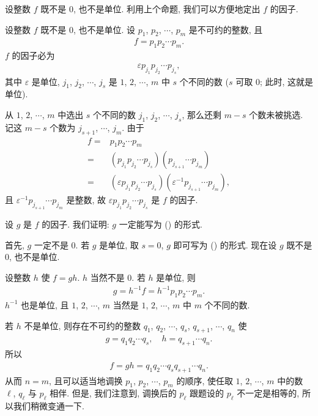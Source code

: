 设整数 $f$ 既不是 $0$, 也不是单位. 利用上个命题, 我们可以方便地定出 $f$ 的因子.

\begin{proposition}
    设整数 $f$ 既不是 $0$, 也不是单位. 设 $p_1$, $p_2$, $\cdots$, $p_m$ 是不可约的整数, 且
    \begin{align*}
        f = p_1 p_2 \cdots p_m.
    \end{align*}
    $f$ 的因子必为
    \begin{align*}
        \varepsilon p_{j_1} p_{j_2} \cdots p_{j_s} \tag*{(\myStar)},
    \end{align*}
    其中 $\varepsilon$ 是单位, $j_1$, $j_2$, $\cdots$, $j_s$ 是 $1$, $2$, $\cdots$, $m$ 中 $s$ 个不同的数 ($s$ 可取 $0$; 此时, 这就是单位).
\end{proposition}

\begin{pf}
    从 $1$, $2$, $\cdots$, $m$ 中选出 $s$ 个不同的数 $j_1$, $j_2$, $\cdots$, $j_s$, 那么还剩 $m-s$ 个数未被挑选. 记这 $m-s$ 个数为 $j_{s+1}$, $\cdots$, $j_m$. 由于
    \begin{align*}
        f
        = {} & p_1 p_2 \cdots p_m                                                                          \\
        = {} & (p_{j_1} p_{j_2} \cdots p_{j_s}) (p_{j_{s+1}} \cdots p_{j_m})                               \\
        = {} & (\varepsilon p_{j_1} p_{j_2} \cdots p_{j_s}) (\varepsilon^{-1} p_{j_{s+1}} \cdots p_{j_m}),
    \end{align*}
    且 $\varepsilon^{-1} p_{j_{s+1}} \cdots p_{j_m}$ 是整数, 故 $\varepsilon p_{j_1} p_{j_2} \cdots p_{j_s}$ 是 $f$ 的因子.

    设 $g$ 是 $f$ 的因子. 我们证明: $g$ 一定能写为 (\myStar) 的形式.

    首先, $g$ 一定不是 $0$. 若 $g$ 是单位, 取 $s = 0$, $g$ 即可写为 (\myStar) 的形式. 现在设 $g$ 既不是 $0$, 也不是单位.

    设整数 $h$ 使 $f = gh$. $h$ 当然不是 $0$. 若 $h$ 是单位, 则
    \begin{align*}
        g = h^{-1} f = h^{-1} p_1 p_2 \cdots p_m.
    \end{align*}
    $h^{-1}$ 也是单位, 且 $1$, $2$, $\cdots$, $m$ 当然是 $1$, $2$, $\cdots$, $m$ 中 $m$ 个不同的数.

    若 $h$ 不是单位, 则存在不可约的整数 $q_1$, $q_2$, $\cdots$, $q_s$, $q_{s+1}$, $\cdots$, $q_n$ 使
    \begin{align*}
        g = q_1 q_2 \cdots q_s, \quad h = q_{s+1} \cdots q_n.
    \end{align*}
    所以
    \begin{align*}
        f = gh = q_1 q_2 \cdots q_s q_{s+1} \cdots q_n.
    \end{align*}
    从而 $n = m$, 且可以适当地调换 $p_1$, $p_2$, $\cdots$, $p_m$ 的顺序, 使任取 $1$, $2$, $\cdots$, $m$ 中的数 $\ell$, $q_\ell$ 与 $p_\ell$ 相伴. 但是, 我们注意到, 调换后的 $p_{\ell}$ 跟题设的 $p_{\ell}$ 不一定是相等的, 所以我们稍微变通一下.


\end{pf}
